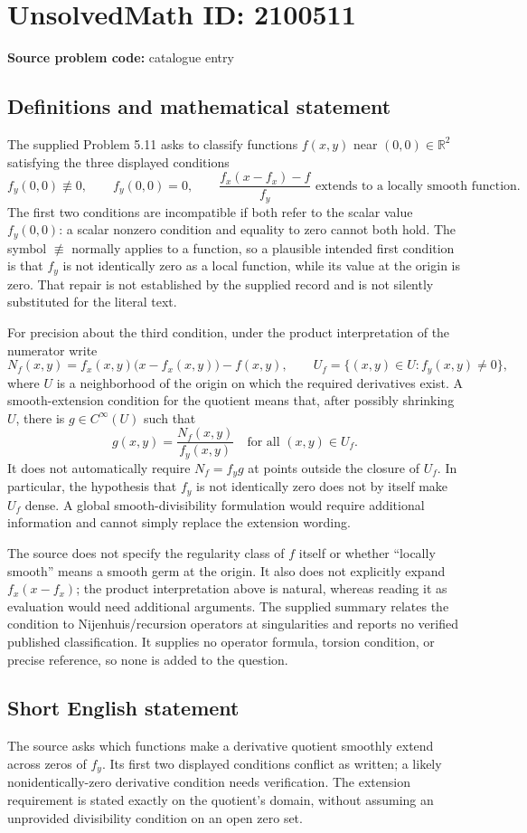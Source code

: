 \documentclass[11pt]{article}
\newcommand{\R}{\mathbb{R}}
\begin{document}
\section*{UnsolvedMath ID: 2100511}
\textbf{Source problem code:} catalogue entry
\subsection{Definitions and mathematical statement}
The supplied Problem 5.11 asks to classify functions $f(x,y)$ near $(0,0)\in\R^2$ satisfying the three displayed conditions
\[
f_y(0,0)\not\equiv0,\qquad f_y(0,0)=0,\qquad
\frac{f_x(x-f_x)-f}{f_y}\text{ extends to a locally smooth function}.
\]
The first two conditions are incompatible if both refer to the scalar value $f_y(0,0)$: a scalar nonzero condition and equality to zero cannot both hold. The symbol $\not\equiv$ normally applies to a function, so a plausible intended first condition is that $f_y$ is not identically zero as a local function, while its value at the origin is zero. That repair is not established by the supplied record and is not silently substituted for the literal text.

For precision about the third condition, under the product interpretation of the numerator write
\[
N_f(x,y)=f_x(x,y)\bigl(x-f_x(x,y)\bigr)-f(x,y),
\qquad U_f=\{(x,y)\in U:f_y(x,y)\ne0\},
\]
where $U$ is a neighborhood of the origin on which the required derivatives exist. A smooth-extension condition for the quotient means that, after possibly shrinking $U$, there is $g\in C^\infty(U)$ such that
\[
g(x,y)=\frac{N_f(x,y)}{f_y(x,y)}
\quad\text{for all }(x,y)\in U_f.
\]
It does not automatically require $N_f=f_yg$ at points outside the closure of $U_f$. In particular, the hypothesis that $f_y$ is not identically zero does not by itself make $U_f$ dense. A global smooth-divisibility formulation would require additional information and cannot simply replace the extension wording.

The source does not specify the regularity class of $f$ itself or whether ``locally smooth'' means a smooth germ at the origin. It also does not explicitly expand $f_x(x-f_x)$; the product interpretation above is natural, whereas reading it as evaluation would need additional arguments. The supplied summary relates the condition to Nijenhuis/recursion operators at singularities and reports no verified published classification. It supplies no operator formula, torsion condition, or precise reference, so none is added to the question.
\subsection{Short English statement}
The source asks which functions make a derivative quotient smoothly extend across zeros of $f_y$. Its first two displayed conditions conflict as written; a likely nonidentically-zero derivative condition needs verification. The extension requirement is stated exactly on the quotient's domain, without assuming an unprovided divisibility condition on an open zero set.
\end{document}
